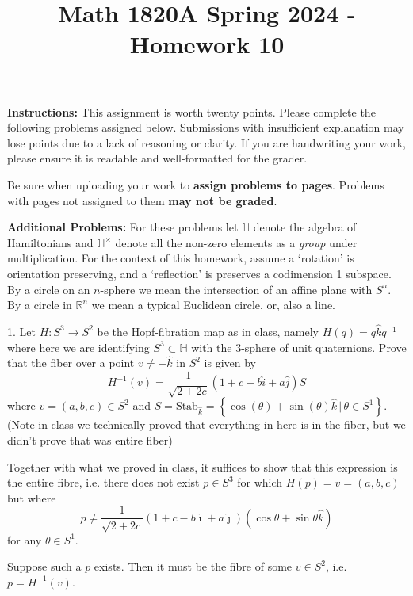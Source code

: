 \documentclass[12pt]{article}
\title{Math 1820A Spring 2024 - Homework 10}
\date{}
\newcommand{\R}{\mathbb{R}}
\newcommand{\lra}{\longrightarrow}
\newcommand{\Ha}{\mathbb{H}}
\newcommand{\ihat}{\hat \imath}
\newcommand{\jhat}{\hat \jmath}
\newcommand{\khat}{\hat k}
\begin{document}
\maketitle
\vspace{-0.5in}
\begin{spacing}{1.5}
\noindent \textbf{Instructions:}  This assignment is worth twenty points.  Please complete the following problems assigned below.  Submissions with insufficient explanation may lose points due to a lack of reasoning or clarity.  If you are handwriting your work, please ensure it is readable and well-formatted for the grader.

Be sure when uploading your work to \textbf{assign problems to pages}.  Problems with pages not assigned to them \textbf{may not be graded}.  
\end{spacing}

\noindent
\textbf{Additional Problems:}   For these problems let $\Ha$ denote the algebra of Hamiltonians and $\Ha^{\times}$ denote all the non-zero elements as a \emph{group} under multiplication.  For the context of this homework, assume a `rotation' is orientation preserving, and a `reflection' is preserves a codimension 1 subspace.  By a circle on an $n$-sphere we mean the intersection of an affine plane with $S^{n}$.  By a circle in $\R^{n}$ we mean a typical Euclidean circle, or, also a line. 

1.  Let $H : S^{3} \lra S^{2}$ be the Hopf-fibration map as in class, namely $H(q) = q\hat{k}q^{-1}$ where here we are identifying $S^{3} \subset \Ha$ with the 3-sphere of unit quaternions.  Prove that the fiber over a point $v \neq -\hat{k}$ in $S^{2}$ is given by
\[H^{-1}(v) = \frac{1}{\sqrt{2+2c}}\left(1 + c - b\hat{i} + a \hat{j}\right)S \]
where $v = (a,b,c) \in S^{2}$ and $S=\text{Stab}_{\hat{k}} = \left\{\cos(\theta) + \sin(\theta)\hat{k} \, | \, \theta \in S^{1} \right\}$.  (Note in class we technically proved that everything in here is in the fiber, but we didn't prove that was entire fiber)

    \color{blue}
        Together with what we proved in class, it suffices to show that this expression is the entire fibre, i.e. there does not exist $p \in S^3$ for which $H(p) = v = (a, b, c)$ but where 
        \[p \neq \frac{1}{\sqrt{2 + 2c}}\left(1 + c - b\ihat + a\jhat\right)\left(\cos \theta + \sin \theta \khat\right)\]
        for any $\theta \in S^1$. 

        Suppose such a $p$ exists. Then it must be the fibre of some $v \in S^2$, i.e. $p = H^{-1}(v)$. 
\end{document}
